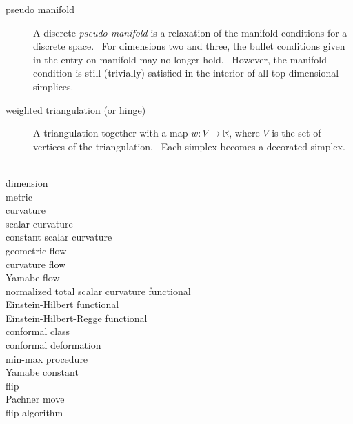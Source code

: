 \begin{description}
\item[pseudo manifold] A discrete \textit{pseudo manifold} is a relaxation
of the manifold conditions for a discrete space. \ For dimensions two and
three, the bullet conditions given in the entry on manifold may no longer
hold. \ However, the manifold condition is still (trivially) satisfied in
the interior of all top dimensional simplices.

\item[weighted triangulation (or hinge)] A triangulation together with a map 
$w:V\rightarrow 
\mathbb{R}
$, where $V$ is the set of vertices of the triangulation. \ Each simplex
becomes a decorated simplex. \ 

\item[dimension] 

\item[metric] 

\item[curvature] 

\item[scalar curvature] 

\item[constant scalar curvature] 

\item[geometric flow] 

\item[curvature flow] 

\item[Yamabe flow] 

\item[normalized total scalar curvature functional] 

\item[Einstein-Hilbert functional] 

\item[Einstein-Hilbert-Regge functional] 

\item[conformal class] 

\item[conformal deformation] 

\item[min-max procedure] 

\item[Yamabe constant] 

\item[flip] 

\item[Pachner move] 

\item[flip algorithm] 


\end{description}

